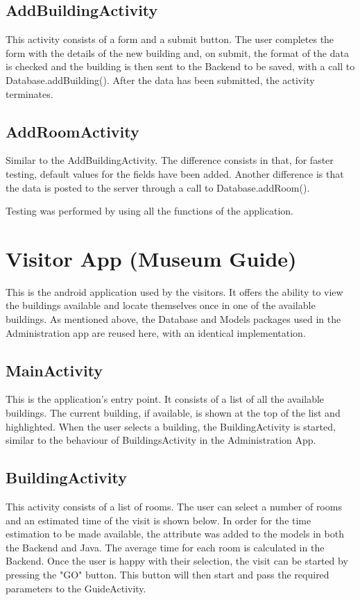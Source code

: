 \subsection{AddBuildingActivity}
This activity consists of a form and a submit button. The user completes the form with the details of the new building and, on submit, the format of the data is checked and the building is then sent to the Backend to be saved, with a call to Database.addBuilding(). After the data has been submitted, the activity terminates. 

\subsection{AddRoomActivity}
Similar to the AddBuildingActivity. The difference consists in that, for faster testing, default values for the fields have been added. Another difference is that the data is posted to the server through a call to Database.addRoom(). 

Testing was performed by using all the functions of the application.
\section{Visitor App (Museum Guide)}
This is the android application used by the visitors. It offers the ability to view the buildings available and locate themselves once in one of the available buildings. As mentioned above, the Database and Models packages used in the Administration app are reused here, with an identical implementation.

\subsection{MainActivity}
This is the application's entry point. It consists of a list of all the available buildings. The current building, if available, is shown at the top of the list and highlighted.  
When the user selects a building, the BuildingActivity is started, similar to the behaviour of BuildingsActivity in the Administration App.
\subsection{BuildingActivity}
This activity consists of a list of rooms. The user can select a number of rooms and an estimated time of the visit is shown below. In order for the time estimation to be made available, the attribute was added to the models in both the Backend and Java. The average time for each room is calculated in the Backend. Once the user is happy with their selection, the visit can be started by pressing the "GO" button. This button will then start and pass the required parameters to the GuideActivity.
